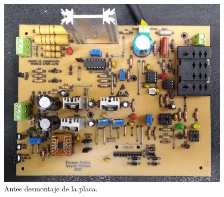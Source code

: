 \begin{figure}[H]
    \centering
    \includegraphics[scale=0.1]{./imagenes/fotos/placa_original.jpg}
    \caption{Antes desmontaje de la placa.}
    \label{F:placa_original}
\end{figure}

